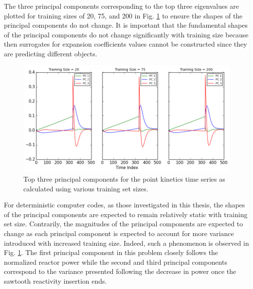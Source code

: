 The three principal components corresponding to the top three eigenvalues are plotted for training sizes of 20, 75, and 200 in Fig. \ref{fig:pk_eigenvectors} to ensure the shapes of the principal components do not change. It is important that the fundamental shapes of the principal components do not change significantly with training size because then surrogates for expansion coefficients values cannot be constructed since they are predicting different objects.   
\begin{figure}[!h]
\caption{\label{fig:pk_eigenvectors}
Top three principal components for the point kinetics time series as calculated using various training set sizes.}
 \begin{center}
  \includegraphics[scale=.7]{./Chapter4/pk_eigenvectors.png}
 \end{center}
\end{figure}
For deterministic computer codes, as those investigated in this thesis, the shapes of the principal components are expected to remain relatively static with training set size. Contrarily, the magnitudes of the principal components are expected to change as each principal component is expected to account for more variance introduced with increased training size. Indeed, such a phenomenon is observed in Fig. \ref{fig:pk_eigenvectors}. The first principal component in this problem closely follows the normalized reactor power while the second and third principal components correspond to the variance presented following the decrease in power once the sawtooth reactivity insertion ends.

